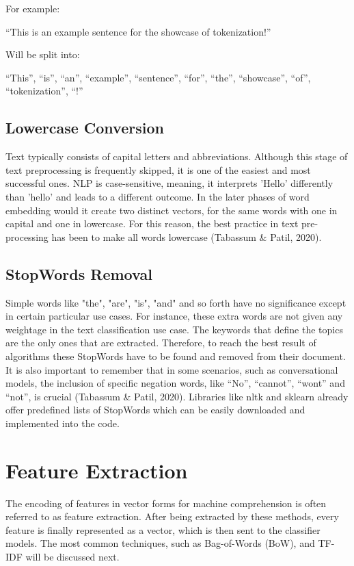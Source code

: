 For example:

“This is an example sentence for the showcase of tokenization!”

Will be split into:

“This”, “is”, “an”, “example”, “sentence”, “for”, “the”, “showcase”, “of”, “tokenization”, “!”

\subsection{Lowercase Conversion}

Text typically consists of capital letters and abbreviations. Although this stage of text preprocessing is frequently skipped, it is one of the easiest and most successful ones. NLP is case-sensitive, meaning, it interprets 'Hello' differently than 'hello' and leads to a different outcome. In the later phases of word embedding would it create two distinct vectors, for the same words with one in capital and one in lowercase. For this reason, the best practice in text pre-processing has been to make all words lowercase (Tabassum \& Patil, 2020).

\subsection{StopWords Removal}

Simple words like "the", "are", "is", "and" and so forth have no significance except in certain particular use cases. For instance, these extra words are not given any weightage in the text classification use case. The keywords that define the topics are the only ones that are extracted. Therefore, to reach the best result of algorithms these StopWords have to be found and removed from their document. It is also important to remember that in some scenarios, such as conversational models, the inclusion of specific negation words, like “No”, “cannot”, “wont” and “not”, is crucial (Tabassum \& Patil, 2020). Libraries like nltk and sklearn already offer predefined lists of StopWords which can be easily downloaded and implemented into the code.

\section{Feature Extraction}

The encoding of features in vector forms for machine comprehension is often referred to as feature extraction. After being extracted by these methods, every feature is finally represented as a vector, which is then sent to the classifier models. The most common techniques, such as Bag-of-Words (BoW), and TF-IDF will be discussed next.

